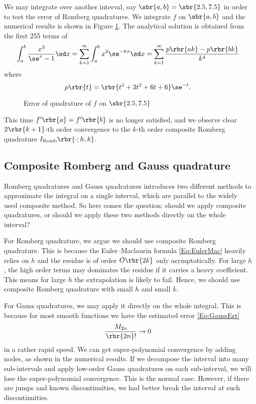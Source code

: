 \documentclass[english, nochinese]{pnote}
\begin{document}
We may integrate over another interval, say $ \sbr{ a, b } = \sbr{ 2.5, 7.5 } $ in order to test the error of Romberg quadratures. We integrate $f$ on $ \sbr{ a, b } $ and the numerical results is shown in Figure \ref{Fig:Romb}. The analytical solution is obtained from the first 255 terms of
\begin{equation}
\int_a^b \frac{x^3}{ \se^x - 1 } \sd x = \sum_{ k = 1 }^{\infty} \int_a^b x^3 \se^{ -k x } \sd x = \sum_{ k = 1 }^{\infty} \frac{ p \rbr{ a k } - p \rbr{ b k } }{k^4}
\end{equation}
where
\begin{equation}
p \rbr{t} = \rbr{ t^3 + 3 t^2 + 6 t + 6 } \se^{-t}.
\end{equation}

\begin{figure}[htbp]
\centering
\scalebox{0.70}{}
\caption{Error of quadrature of $f$ on $ \sbr{ 2.5, 7.5 } $}
\label{Fig:Romb}
\end{figure}

This time $ f' \rbr{a} = f' \rbr{b} $ is no longer satisfied, and we observe clear $ 2 \rbr{ k + 1 } $-th order convergence to the $k$-th order composite Romberg quadrature $ I_{\text{Romb}} \rbr{ \cdot; h, k } $.

\subsection{Composite Romberg and Gauss quadrature}

Romberg quadratures and Gauss quadratures introduces two different methods to approximate the integral on a single interval, which are parallel to the widely used composite method. So here comes the question: should we apply composite quadratures, or should we apply these two methods directly on the whole interval?

For Romberg quadrature, we argue we should use composite Romberg quadrature. This is because the Euler--Maclaurin formula \eqref{Eq:EulerMac} heavily relies on $h$ and the residue is of order $ O \rbr{ 2 k } $ only asymptotically. For large $h$, the high order terms may dominates the residue if it carries a heavy coefficient. This means for large $h$ the extrapolation is likely to fail. Hence, we should use composite Romberg quadrature with small $h$ and small $k$.

For Gauss quadratures, we may apply it directly on the whole integral. This is because for most smooth functions we have the estimated error \ref{Eq:GaussEst}
\begin{equation}
\frac{M_{ 2 n }}{ \rbr{ 2 n } ! } \rightarrow 0
\end{equation}
in a rather rapid speed. We can get super-polynomial convergence by adding nodes, as shown in the numerical results. If we decompose the interval into many sub-intervals and apply low-order Gauss quadratures on each sub-interval, we will lose the super-polynomial convergence. This is the normal case. However, if there are jumps and known discontinuities, we had better break the interval at such discontinuities.
\end{document}

